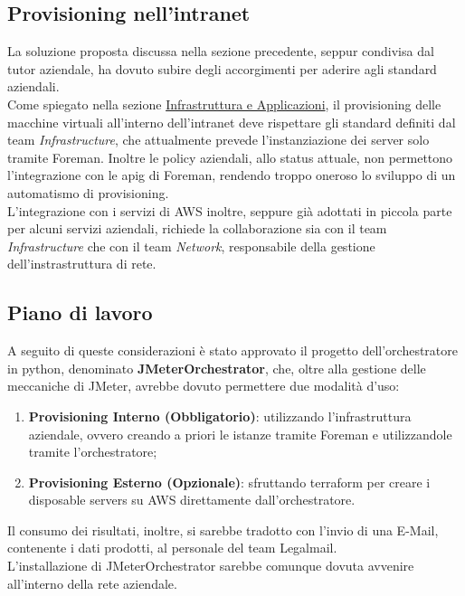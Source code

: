 \subsection{Provisioning nell'intranet}
La soluzione proposta discussa nella sezione precedente, seppur condivisa dal tutor aziendale, ha dovuto subire degli accorgimenti per aderire agli standard aziendali.\\
Come spiegato nella sezione \hyperref[subsec:infra]{Infrastruttura e Applicazioni}, il provisioning delle macchine virtuali all'interno dell'\gls{intranet} deve rispettare gli standard definiti dal team \textit{Infrastructure}, che attualmente prevede l'instanziazione dei server solo tramite Foreman. Inoltre le policy aziendali, allo status attuale, non permettono l'integrazione con le \gls{apig} di Foreman, rendendo troppo oneroso lo sviluppo di un automatismo di provisioning. \\
L'integrazione con i servizi di AWS inoltre, seppure già adottati in piccola parte per alcuni servizi aziendali, richiede la collaborazione sia con il team \textit{Infrastructure} che con il team \textit{Network}, responsabile della gestione dell'instrastruttura di rete.

\subsection{Piano di lavoro}
A seguito di queste considerazioni è stato approvato il progetto dell'orchestratore in python, denominato \textbf{JMeterOrchestrator}, che, oltre alla gestione delle meccaniche di JMeter, avrebbe dovuto permettere due modalità d'uso:
\begin{enumerate}
	\item \textbf{Provisioning Interno (Obbligatorio)}: utilizzando l'infrastruttura aziendale, ovvero creando a priori le istanze tramite Foreman e utilizzandole tramite l'orchestratore;
	\item \textbf{Provisioning Esterno (Opzionale)}: sfruttando terraform per creare i disposable servers su AWS direttamente dall'orchestratore.
\end{enumerate}
Il consumo dei risultati, inoltre, si sarebbe tradotto con l'invio di una E-Mail, contenente i dati prodotti, al personale del team Legalmail. \\
L'installazione di JMeterOrchestrator sarebbe comunque dovuta avvenire all'interno della rete aziendale.